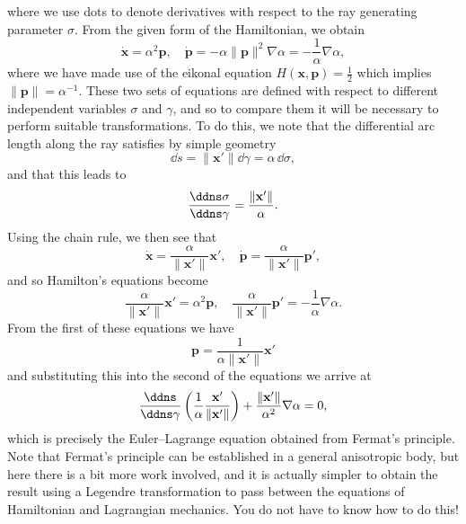 \documentclass[a4paper,10pt]{paper}
\begin{document}
\begin{enumerate}
\begin{equation*}
\end{equation*}
where we use dots to denote derivatives with respect to the ray generating parameter $\sigma$. From the given form of the Hamiltonian, we obtain
\begin{equation*}
    \dot{\mathbf{x}}=\alpha^{2}\mathbf{p}, \quad \dot{\mathbf{p}}=-\alpha\|\mathbf{p}\|^{2}\nabla\alpha = -\frac{1}{\alpha}\nabla\alpha,
\end{equation*}
where we have made use of the eikonal equation $H(\mathbf{x},\mathbf{p})=\frac{1}{2}$ which implies $\|\mathbf{p}\|=\alpha^{-1}$. These two sets of equations are defined with respect to different independent variables $\sigma$ and $\gamma$, and so to compare them it will be necessary to perform suitable transformations. To do this, we note that the differential arc length along the ray satisfies by simple geometry
\begin{equation*}
    \dd s=\|\mathbf{x}'\|\dd\gamma=\alpha\,\dd\sigma,
\end{equation*}
and that this leads to
\begin{equation*}
    \frac{\ddns\sigma}{\ddns\gamma}=\frac{\|\mathbf{x}'\|}{\alpha}.
\end{equation*}
Using the chain rule, we then see that
\begin{equation*}
    \dot{\mathbf{x}}=\frac{\alpha}{\|\mathbf{x}'\|}\mathbf{x}', \quad \dot{\mathbf{p}}=\frac{\alpha}{\|\mathbf{x}'\|}\mathbf{p}',
\end{equation*}
and so Hamilton's equations become
\begin{equation*}
    \frac{\alpha}{\|\mathbf{x}'\|}\mathbf{x}'=\alpha^{2}\mathbf{p}, \quad \frac{\alpha}{\|\mathbf{x}'\|}\mathbf{p}'=-\frac{1}{\alpha}\nabla\alpha.
\end{equation*}
From the first of these equations we have
\begin{equation*}
    \mathbf{p}=\frac{1}{\alpha\|\mathbf{x}'\|}\mathbf{x}'
\end{equation*}
and substituting this into the second of the equations we arrive at
\begin{equation*}
    \frac{\ddns}{\ddns\gamma}\left(\frac{1}{\alpha}\frac{\mathbf{x}'}{\|\mathbf{x}'\|}\right)+\frac{\|\mathbf{x}'\|}{\alpha^{2}}\nabla\alpha=0,
\end{equation*}
which is precisely the Euler--Lagrange equation obtained from Fermat's principle. Note that Fermat's principle can be established in a general anisotropic body, but here there is a bit more work involved, and it is actually simpler to obtain the result using a Legendre transformation to pass between the equations of Hamiltonian and Lagrangian mechanics. You do not have to know how to do this!




\end{enumerate}
\end{document}
